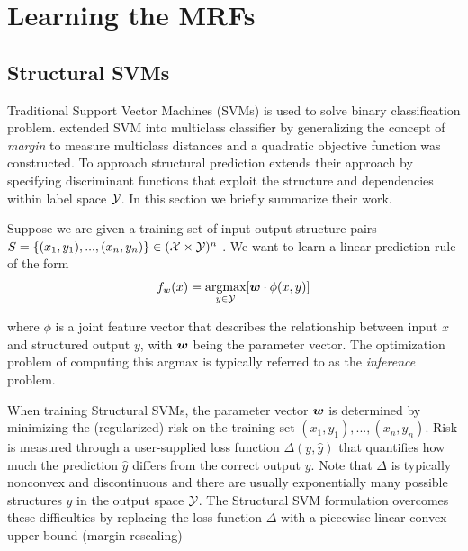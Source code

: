 

\section{Learning the MRFs}
\label{sec:learning}

\subsection{Structural SVMs}
\label{sec:ssvm}

Traditional Support Vector Machines (SVMs) is used to solve
binary classification problem. 
extended SVM into multiclass classifier by generalizing the
concept of \emph{margin} to measure multiclass distances and a
quadratic objective function was constructed. To approach
structural prediction  extends
their approach by specifying discriminant functions that exploit
the structure and dependencies within label space $\Y$. In this
section we briefly summarize their work.

Suppose we are given a training set of input-output structure
pairs $S=\{(x_1,y_1),...,(x_n,y_n)\}\in(\X\times \Y)^n$ . We want
to learn a linear prediction rule of the form
\begin{align}
  \label{eq:ssvm}
  f_w(x)=\argmax_{ y\in \Y } [\bw\cdot\phi(x,y)]
\end{align}


where $\phi$ is a joint feature vector that describes the
relationship between input $x$ and structured output $y$, with
${\boldsymbol{w}}$ being the parameter vector. The optimization problem of
computing this argmax is typically referred to as the \emph{
  inference } problem.

When training Structural SVMs, the parameter vector ${\boldsymbol{w}}$ is
determined by minimizing the (regularized) risk on the training
set $(x_1,y_1),...,(x_n,y_n)$. Risk is measured through a
user-supplied loss function $\Delta(y,\hat{ y })$ that quantifies
how much the prediction $\hat{y}$ differs from the correct output
$y$. Note that $\Delta$ is typically nonconvex and discontinuous
and there are usually exponentially many possible structures
$\hat{y}$ in the output space $\Y$. The Structural SVM
formulation\cite{tsochantaridis2005large} overcomes these
difficulties by replacing the loss function $\Delta$ with a
piecewise linear convex upper bound (margin rescaling)

